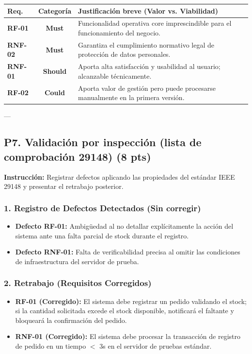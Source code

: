 \documentclass[12pt,a4paper]{article}
\begin{document}
\begin{table}[H]
\centering
\small
\begin{tabularx}{\textwidth}{|l|c|X|}
\hline
\textbf{Req.} & \textbf{Categoría} & \textbf{Justificación breve (Valor vs. Viabilidad)} \\
\hline
\textbf{RF-01} & \textbf{Must} & Funcionalidad operativa core imprescindible para el funcionamiento del negocio. \\
\hline
\textbf{RNF-02} & \textbf{Must} & Garantiza el cumplimiento normativo legal de protección de datos personales. \\
\hline
\textbf{RNF-01} & \textbf{Should} & Aporta alta satisfacción y usabilidad al usuario; alcanzable técnicamente. \\
\hline
\textbf{RF-02} & \textbf{Could} & Aporta valor de gestión pero puede procesarse manualmente en la primera versión. \\
\hline
\end{tabularx}
\end{table}

---

\subsection*{P7. Validación por inspección (lista de comprobación 29148) (8 pts)}
\textbf{Instrucción:} Registrar defectos aplicando las propiedades del estándar IEEE 29148 y presentar el retrabajo posterior.

\subsubsection*{1. Registro de Defectos Detectados (Sin corregir)}
\begin{itemize}[leftmargin=*]
    \item \textbf{Defecto RF-01:} Ambigüedad al no detallar explícitamente la acción del sistema ante una falta parcial de stock durante el registro.
    \item \textbf{Defecto RNF-01:} Falta de verificabilidad precisa al omitir las condiciones de infraestructura del servidor de prueba.
\end{itemize}

\subsubsection*{2. Retrabajo (Requisitos Corregidos)}
\begin{itemize}[leftmargin=*]
    \item \textbf{RF-01 (Corregido):} El sistema debe registrar un pedido validando el stock; si la cantidad solicitada excede el stock disponible, notificará el faltante y bloqueará la confirmación del pedido.
    \item \textbf{RNF-01 (Corregido):} El sistema debe procesar la transacción de registro de pedido en un tiempo $<$ 3s en el servidor de pruebas estándar.
\end{itemize}
\end{document}
